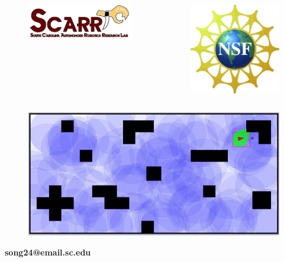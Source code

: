 \documentclass[compress]{beamer}
\begin{document}
\begin{frame} \frametitle{}
\begin{columns}
\begin{figure}
    \includegraphics[scale=0.22]{scarr-logo.jpg}
\end{figure}
\begin{figure}
    \includegraphics[scale=0.4]{NSF_logo.jpg}
\end{figure}
\end{columns}
\begin{center}
\begin{figure}
    \includegraphics[scale=0.25]{clutter_dbrect_cover.jpg}
\end{figure}
\textcolor[rgb]{0.50,0.00,0.00}{\textbf{song24@email.sc.edu}}
\end{center}

\transboxout
\end{frame}
\end{document}
